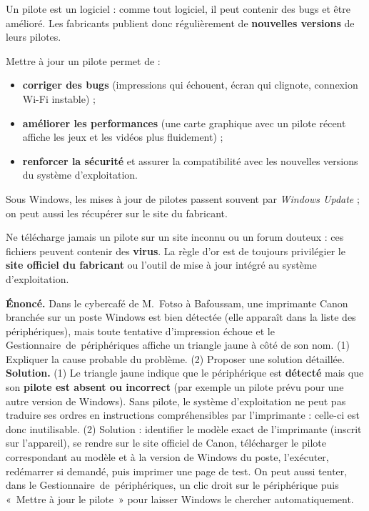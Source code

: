 \documentclass[11pt]{article}
\newcounter{popsec}
\newcounter{popsub}
\newcommand{\courssub}[1]{%
  \stepcounter{popsub}%
  \par\vspace{9pt}\noindent{\popxbold\fontsize{11.5}{13}\selectfont\color{popink}{\color{poporange}\thepopsec.\thepopsub}\hspace{6pt}#1}\par\nopagebreak\vspace{4pt}
}
\begin{document}
\courssub{La mise à jour des pilotes}

Un pilote est un logiciel : comme tout logiciel, il peut contenir des bugs et être amélioré. Les fabricants publient donc régulièrement de \textbf{nouvelles versions} de leurs pilotes.

\begin{aretenir}
Mettre à jour un pilote permet de :
\begin{itemize}
  \item \textbf{corriger des bugs} (impressions qui échouent, écran qui clignote, connexion Wi-Fi instable) ;
  \item \textbf{améliorer les performances} (une carte graphique avec un pilote récent affiche les jeux et les vidéos plus fluidement) ;
  \item \textbf{renforcer la sécurité} et assurer la compatibilité avec les nouvelles versions du système d'exploitation.
\end{itemize}
Sous Windows, les mises à jour de pilotes passent souvent par \emph{Windows Update} ; on peut aussi les récupérer sur le site du fabricant.
\end{aretenir}

\begin{attention}
Ne télécharge jamais un pilote sur un site inconnu ou un forum douteux : ces fichiers peuvent contenir des \textbf{virus}. La règle d'or est de toujours privilégier le \textbf{site officiel du fabricant} ou l'outil de mise à jour intégré au système d'exploitation.
\end{attention}

\begin{exoresolu}
\textbf{Énoncé.} Dans le cybercafé de M.~Fotso à Bafoussam, une imprimante Canon branchée sur un poste Windows est bien détectée (elle apparaît dans la liste des périphériques), mais toute tentative d'impression échoue et le Gestionnaire~de~périphériques affiche un triangle jaune à côté de son nom. (1) Expliquer la cause probable du problème. (2) Proposer une solution détaillée.
\tcblower
\textbf{Solution.} (1) Le triangle jaune indique que le périphérique est \textbf{détecté} mais que son \textbf{pilote est absent ou incorrect} (par exemple un pilote prévu pour une autre version de Windows). Sans pilote, le système d'exploitation ne peut pas traduire ses ordres en instructions compréhensibles par l'imprimante : celle-ci est donc inutilisable. (2) Solution : identifier le modèle exact de l'imprimante (inscrit sur l'appareil), se rendre sur le site officiel de Canon, télécharger le pilote correspondant au modèle et à la version de Windows du poste, l'exécuter, redémarrer si demandé, puis imprimer une page de test. On peut aussi tenter, dans le Gestionnaire~de~périphériques, un clic droit sur le périphérique puis «~Mettre à jour le pilote~» pour laisser Windows le chercher automatiquement.
\end{exoresolu}
\end{document}
